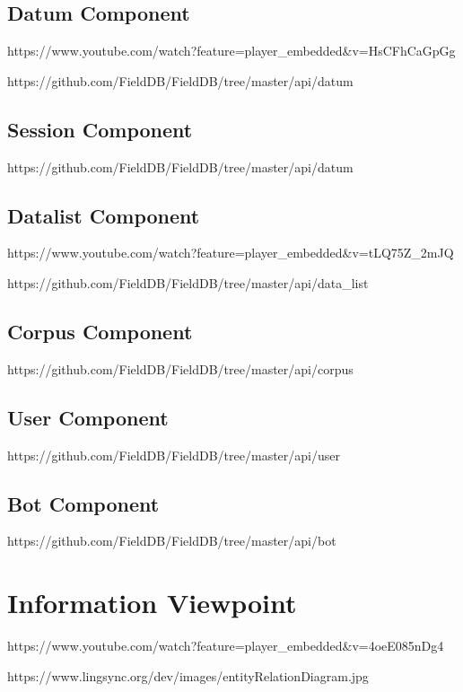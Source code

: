 \documentclass[12pt]{article}
\begin{document}
\subsection{Datum Component}

https://www.youtube.com/watch?feature=player\_embedded\&v=HsCFhCaGpGg

https://github.com/FieldDB/FieldDB/tree/master/api/datum

\subsection{Session Component}
https://github.com/FieldDB/FieldDB/tree/master/api/datum

\subsection{Datalist Component}

https://www.youtube.com/watch?feature=player\_embedded\&v=tLQ75Z_2mJQ

https://github.com/FieldDB/FieldDB/tree/master/api/data_list

\subsection{Corpus Component}

https://github.com/FieldDB/FieldDB/tree/master/api/corpus

\subsection{User Component}

https://github.com/FieldDB/FieldDB/tree/master/api/user


\subsection{Bot Component}

https://github.com/FieldDB/FieldDB/tree/master/api/bot

\section{Information Viewpoint}

https://www.youtube.com/watch?feature=player_embedded\&v=4oeE085nDg4


https://www.lingsync.org/dev/images/entityRelationDiagram.jpg
\end{document}
